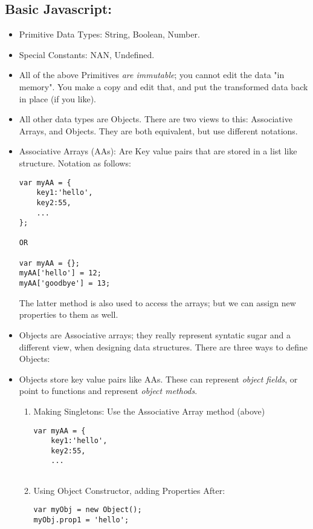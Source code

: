 \documentclass[8pt,a4paper]{extarticle}
\begin{document}
\subsection*{Basic Javascript:}
\begin{itemize}
\item Primitive Data Types: String, Boolean, Number.
\item Special Constants: NAN, Undefined.
\item All of the above Primitives \textit{are immutable}; you cannot edit the data "in memory". You make a copy and edit that, and put the transformed data back in place (if you like).
\item All other data types are Objects. There are two views to this: Associative Arrays, and Objects. They are both equivalent, but use different notations.

\item Associative Arrays (AAs): Are Key value pairs that are stored in a list like structure. Notation as follows:

\begin{verbatim}
var myAA = {
	key1:'hello',
	key2:55,
	...
};

OR

var myAA = {};
myAA['hello'] = 12;
myAA['goodbye'] = 13;
\end{verbatim}

The latter method is also used to access the arrays; but we can assign new properties to them as well.

\item Objects are Associative arrays; they really represent syntatic sugar and a different view, when designing data structures. There are three ways to define Objects:
\item Objects store key value pairs like AAs. These can represent \textit{object fields}, or point to functions and represent \textit{object methods}.

\begin{enumerate}
\item Making Singletons: Use the Associative Array method (above)
\begin{verbatim}
var myAA = {
	key1:'hello',
	key2:55,
	...
	
\end{verbatim}

\item Using Object Constructor, adding Properties After:

\begin{verbatim}
var myObj = new Object();
myObj.prop1 = 'hello';
\end{verbatim}


\end{enumerate}
\end{itemize}
\end{document}
